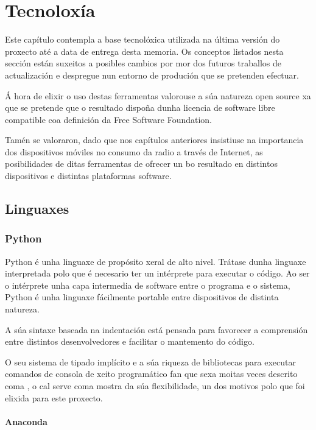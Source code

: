 \chapter[Tecnoloxías Utilizadas]{
  \label{chp:tecnologia}
  Tecnoloxía
}
\minitoc
\newpage

Este capítulo contempla a base tecnolóxica utilizada na última versión do proxecto até a data
de entrega desta memoria. Os conceptos listados nesta sección están suxeitos a posibles cambios
por mor dos futuros traballos de actualización e despregue nun entorno de produción que se pretenden
efectuar. 

Á hora de elixir o uso destas ferramentas valorouse a súa natureza open source xa que se pretende que o
resultado dispoña dunha licencia de software libre compatible coa definición da Free Software
Foundation. 

Tamén se valoraron, dado que nos capítulos anteriores insistiuse na importancia dos dispositivos móviles
no consumo da radio a través de Internet, as posibilidades de ditas ferramentas de ofrecer un bo resultado
en distintos dispositivos e distintas plataformas software. 


\section{Linguaxes}

\subsection{Python}

Python é unha linguaxe de propósito xeral de alto nivel. Trátase dunha linguaxe interpretada polo que é necesario 
ter un intérprete para executar o código. Ao ser o intérprete unha capa intermedia de software entre o programa
e o sistema, Python é unha linguaxe fácilmente portable entre dispositivos de distinta natureza.

A súa sintaxe baseada na indentación está pensada para favorecer a comprensión entre distintos desenvolvedores e 
facilitar o mantemento do código. 

O seu sistema de tipado implícito e a súa riqueza de bibliotecas para executar comandos de consola de xeito programático
fan que sexa moitas veces descrito coma \cite{python1}, o cal serve coma 
mostra da súa flexibilidade, un dos motivos polo que foi elixida para este proxecto.

\subsubsection{Anaconda}

